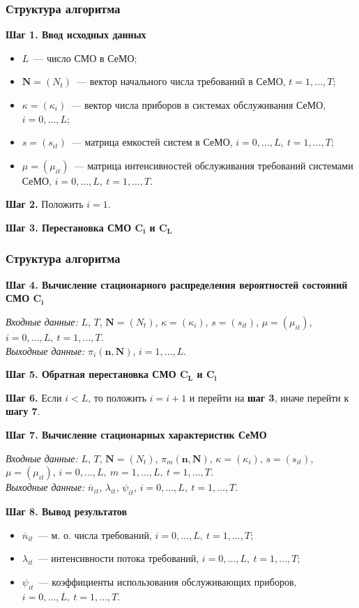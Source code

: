 \begin{frame} \frametitle{Структура алгоритма}
\textbf{Шаг 1. Ввод исходных данных}

\begin{itemize}
\item $L$~--- число СМО в СеМО;
\item $\mathbf{N}=(N_t)$~--- вектор начального числа требований в СеМО, $t=1,...,T$;
\item $\kappa=(\kappa_i)$~--- вектор числа приборов в системах обслуживания СеМО, $i=0,...,L$;
\item $s=(s_{it})$~--- матрица емкостей систем в СеМО, $i=0,...,L,~t=1,...,T$;
\item $\mu=(\mu_{it})$~--- матрица интенсивностей обслуживания требований системами СеМО, $i=0,...,L,~t=1,...,T$.
\end{itemize}

\textbf{Шаг 2.} Положить $i = 1$.

\textbf{Шаг 3. Перестановка СМО $\boldsymbol{C_i}$ и $\boldsymbol{C_L}$}

\end{frame}


\begin{frame} \frametitle{Структура алгоритма}

\textbf{Шаг 4. Вычисление стационарного распределения вероятностей состояний СМО $\boldsymbol{C_i}$}

\emph{Входные данные:} $L$, $T$, $\mathbf{N}=(N_t)$, $\kappa=(\kappa_i)$, $s=(s_{it})$, $\mu=(\mu_{it})$, $i=0,...,L,~t=1,...,T$.\\
\emph{Выходные данные:} $\pi_i(\mathbf{n},\mathbf{N})$, $i=1,...,L$.

\textbf{Шаг 5. Обратная перестановка СМО $\boldsymbol{C_L}$ и $\boldsymbol{C_i}$}

\textbf{Шаг 6.} Если $i < L$, то положить $i=i+1$ и перейти на \textbf{шаг 3}, иначе перейти к \textbf{шагу 7}.

\textbf{Шаг 7. Вычисление стационарных характеристик СеМО}

\emph{Входные данные:} $L$, $T$, $\mathbf{N}=(N_t)$, $\pi_m(\mathbf{n},\mathbf{N})$, $\kappa=(\kappa_i)$, $s=(s_{it})$, $\mu=(\mu_{it})$, $i=0,...,L,~m=1,...,L,~t=1,...,T$.\\
\emph{Выходные данные:} $\overline{n}_{it}$, $\lambda_{it}$, $\psi_{it}$, $i=0,...,L,~t=1,...,T$.

\textbf{Шаг 8. Вывод результатов}

\begin{itemize}
\item $\overline{n}_{it}$~--- м. о. числа требований, $i=0,...,L,~t=1,...,T$;
\item $\lambda_{it}$~--- интенсивности потока требований, $i=0,...,L,~t=1,...,T$;
\item $\psi_{it}$~--- коэффициенты использования обслуживающих приборов, $i=0,...,L,~t=1,...,T$.
\end{itemize}
\end{frame}

